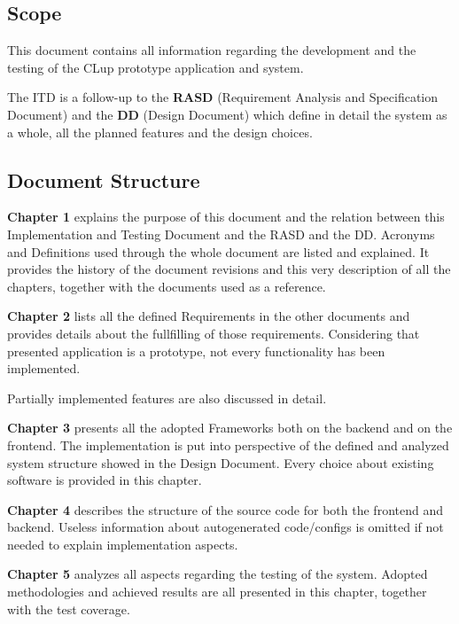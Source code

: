 \subsection{Scope}
This document contains all information regarding the development and the testing of the CLup prototype application and system.

The ITD is a follow-up to the \textbf{RASD} (Requirement Analysis and Specification Document) and the \textbf{DD} (Design Document) which define in detail the system as a whole, all the planned features and the design choices.

\subsection{Document Structure}

\textbf{Chapter 1} explains the purpose of this document and the relation between this Implementation and Testing Document and the RASD and the DD.
Acronyms and Definitions used through the whole document are listed and explained.
It provides the history of the document revisions and this very description of all the chapters, together with the documents used as a reference.

\medskip

\textbf{Chapter 2} lists all the defined Requirements in the other documents and provides details about the fullfilling of those requirements. Considering that presented application is a prototype, not every functionality has been implemented.

Partially implemented features are also discussed in detail.

\medskip

\textbf{Chapter 3} presents all the adopted Frameworks both on the backend and on the frontend. The implementation is put into perspective of the defined and analyzed system structure showed in the Design Document. Every choice about existing software is provided in this chapter.

\medskip


\textbf{Chapter 4} describes the structure of the source code for both the frontend and backend. Useless information about autogenerated code/configs is omitted if not needed to explain implementation aspects.

\medskip


\textbf{Chapter 5} analyzes all aspects regarding the testing of the system. Adopted methodologies and achieved results are all presented in this chapter, together with the test coverage.

